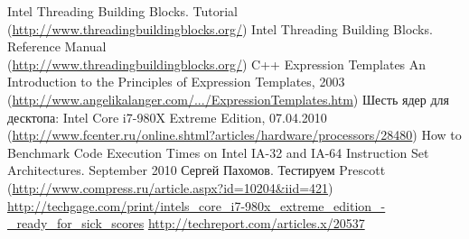 \documentclass[12pt, a4paper, utf8]{article}
\begin{document}
\begin{thebibliography}{99}
	 Intel Threading Building Blocks. Tutorial \\ (\href{http://www.threadingbuildingblocks.org/}{http://www.threadingbuildingblocks.org/})
	 Intel Threading Building Blocks. Reference Manual \\ (\href{http://www.threadingbuildingblocks.org/}{http://www.threadingbuildingblocks.org/})
	 C++ Expression Templates An Introduction to the Principles of Expression Templates, 2003 \\ (\href{http://www.angelikalanger.com/Articles/Cuj/ExpressionTemplates/ExpressionTemplates.htm}{http://www.angelikalanger.com/.../ExpressionTemplates.htm})
	 Шесть ядер для десктопа: Intel Core i7-980X Extreme Edition, 07.04.2010 \\ (\href{http://www.fcenter.ru/online.shtml?articles/hardware/processors/28480}{\small http://www.fcenter.ru/online.shtml?articles/hardware/processors/28480})
	 How to Benchmark Code Execution Times on Intel IA-32 and IA-64 Instruction Set Architectures. September 2010
	 Сергей Пахомов. Тестируем Prescott \\ (\href{http://www.compress.ru/article.aspx?id=10204&iid=421}{\small http://www.compress.ru/article.aspx?id=10204\&iid=421})
	\href{http://techgage.com/print/intels_core_i7-980x_extreme_edition_-_ready_for_sick_scores}{\small http://techgage.com/print/intels\_core\_i7-980x\_extreme\_edition\_-\_ready\_for\_sick\_scores}
	\href{http://techreport.com/articles.x/20537}{\small http://techreport.com/articles.x/20537}
\end{thebibliography}

\newpage
\listoffigures

\newpage
\listoftables

\newpage

\end{document}

